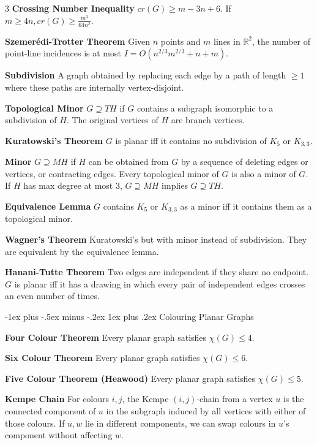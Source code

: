\documentclass[10pt, landscape]{article}
\makeatletter
\renewcommand{\subsection}{\@startsection{subsection}{3}{0mm}%
                                {-1ex plus -.5ex minus -.2ex}%
                                {1ex plus .2ex}%
                                {\normalfont\small\bfseries}}%
\makeatother
\begin{document}
\begin{multicols*}{3}
\textbf{Crossing Number Inequality} $cr(G) \geq m-3n+6$. If $m \geq 4n, cr(G) \geq \frac{m^3}{64n^2}$.

\textbf{Szemerédi-Trotter Theorem} Given $n$ points and $m$ lines in $\mathbb{R}^2$, the number of point-line incidences is at most $I=O(n^{2/3}m^{2/3}+n+m)$.

\textbf{Subdivision} A graph obtained by replacing each edge by a path of length $\geq 1$ where these paths are internally vertex-disjoint.

\textbf{Topological Minor} $G \supseteq TH$ if $G$ contains a subgraph isomorphic to a subdivision of $H$. The original vertices of $H$ are branch vertices.

\textbf{Kuratowski's Theorem} $G$ is planar iff it contains no subdivision of $K_5$ or $K_{3,3}$.

\textbf{Minor} $G \supseteq MH$ if $H$ can be obtained from $G$ by a sequence of deleting edges or vertices, or contracting edges. Every topological minor of $G$ is also a minor of $G$. If $H$ has max degree at most 3, $G \supseteq MH$ implies $G \supseteq TH$.

\textbf{Equivalence Lemma} $G$ contains $K_5$ or $K_{3,3}$ as a minor iff it contains them as a topological minor.

\textbf{Wagner's Theorem} Kuratowski's but with minor instead of subdivision. They are equivalent by the equivalence lemma.

\textbf{Hanani-Tutte Theorem} Two edges are independent if they share no endpoint. $G$ is planar iff it has a drawing in which every pair of independent edges crosses an even number of times.

\subsection{Colouring Planar Graphs}

\textbf{Four Colour Theorem} Every planar graph satisfies $\chi(G) \leq 4$.

\textbf{Six Colour Theorem} Every planar graph satisfies $\chi(G) \leq 6$.

\textbf{Five Colour Theorem (Heawood)} Every planar graph satisfies $\chi(G) \leq 5$.

\textbf{Kempe Chain} For colours $i, j$, the Kempe $(i,j)$-chain from a vertex $u$ is the connected component of $u$ in the subgraph induced by all vertices with either of those colours. If $u,w$ lie in different components, we can swap colours in $u$'s component without affecting $w$.


\end{multicols*}
\end{document}
